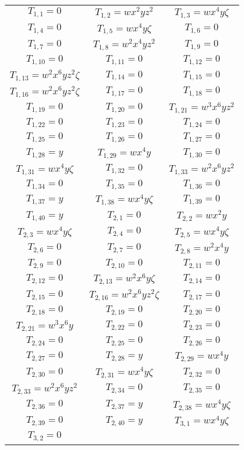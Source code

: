 \normalsize
\tiny
\begin{longtable}{|c|c|c|} 
\hline
$T_{1,1}= 0$&
$T_{1,2}= wx^2yz^2$&
$T_{1,3}= wx^4y\zeta$\\
$T_{1,4}= 0$&
$T_{1,5}= wx^4y\zeta$&
$T_{1,6}= 0$\\
$T_{1,7}= 0$&
$T_{1,8}= w^2x^4yz^2$&
$T_{1,9}= 0$\\
$T_{1,10}= 0$&
$T_{1,11}= 0$&
$T_{1,12}= 0$\\
$T_{1,13}= w^2x^6yz^2\zeta$&
$T_{1,14}= 0$&
$T_{1,15}= 0$\\
$T_{1,16}= w^2x^6yz^2\zeta$&
$T_{1,17}= 0$&
$T_{1,18}= 0$\\
$T_{1,19}= 0$&
$T_{1,20}= 0$&
$T_{1,21}= w^3x^6yz^2$\\
$T_{1,22}= 0$&
$T_{1,23}= 0$&
$T_{1,24}= 0$\\
$T_{1,25}= 0$&
$T_{1,26}= 0$&
$T_{1,27}= 0$\\
$T_{1,28}= y$&
$T_{1,29}= wx^4y$&
$T_{1,30}= 0$\\
$T_{1,31}= wx^4y\zeta$&
$T_{1,32}= 0$&
$T_{1,33}= w^2x^6yz^2$\\
$T_{1,34}= 0$&
$T_{1,35}= 0$&
$T_{1,36}= 0$\\
$T_{1,37}= y$&
$T_{1,38}= wx^4y\zeta$&
$T_{1,39}= 0$\\
$T_{1,40}= y$&
$T_{2,1}= 0$&
$T_{2,2}= wx^2y$\\
$T_{2,3}= wx^4y\zeta$&
$T_{2,4}= 0$&
$T_{2,5}= wx^4y\zeta$\\
$T_{2,6}= 0$&
$T_{2,7}= 0$&
$T_{2,8}= w^2x^4y$\\
$T_{2,9}= 0$&
$T_{2,10}= 0$&
$T_{2,11}= 0$\\
$T_{2,12}= 0$&
$T_{2,13}= w^2x^6y\zeta$&
$T_{2,14}= 0$\\
$T_{2,15}= 0$&
$T_{2,16}= w^2x^6yz^2\zeta$&
$T_{2,17}= 0$\\
$T_{2,18}= 0$&
$T_{2,19}= 0$&
$T_{2,20}= 0$\\
$T_{2,21}= w^3x^6y$&
$T_{2,22}= 0$&
$T_{2,23}= 0$\\
$T_{2,24}= 0$&
$T_{2,25}= 0$&
$T_{2,26}= 0$\\
$T_{2,27}= 0$&
$T_{2,28}= y$&
$T_{2,29}= wx^4y$\\
$T_{2,30}= 0$&
$T_{2,31}= wx^4y\zeta$&
$T_{2,32}= 0$\\
$T_{2,33}= w^2x^6yz^2$&
$T_{2,34}= 0$&
$T_{2,35}= 0$\\
$T_{2,36}= 0$&
$T_{2,37}= y$&
$T_{2,38}= wx^4y\zeta$\\
$T_{2,39}= 0$&
$T_{2,40}= y$&
$T_{3,1}= wx^4y\zeta$\\
$T_{3,2}= 0$&

\end{longtable}
